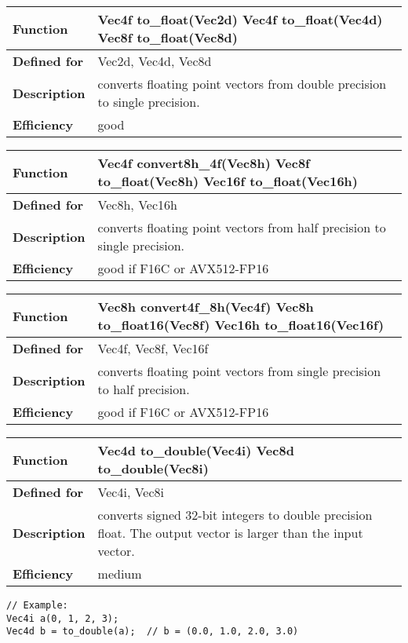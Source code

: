 \documentclass[vcl_manual.tex]{subfiles}
\begin{document}
\begin{tabular}{|p{30mm}|p{120mm}|}
\hline
\bfseries Function & 
Vec4f to\_float(Vec2d) \newline
Vec4f to\_float(Vec4d) \newline
Vec8f to\_float(Vec8d) \\ \hline
\bfseries Defined for & Vec2d, Vec4d, Vec8d \\ \hline
\bfseries Description & converts floating point vectors from double precision to single precision. \\ \hline
\bfseries Efficiency & good \\ \hline
\end{tabular}

\begin{tabular}{|p{30mm}|p{120mm}|}
\hline
\bfseries Function & 
Vec4f convert8h\_4f(Vec8h) \newline
Vec8f to\_float(Vec8h) \newline
Vec16f to\_float(Vec16h) \\ \hline
\bfseries Defined for & Vec8h, Vec16h \\ \hline
\bfseries Description & converts floating point vectors from half precision to single precision. \\ \hline
\bfseries Efficiency & good if F16C or AVX512-FP16 \\ \hline
\end{tabular}

\begin{tabular}{|p{30mm}|p{120mm}|}
\hline
\bfseries Function & 
Vec8h convert4f\_8h(Vec4f) \newline
Vec8h to\_float16(Vec8f) \newline
Vec16h to\_float16(Vec16f) \\ \hline
\bfseries Defined for & Vec4f, Vec8f, Vec16f \\ \hline
\bfseries Description & converts floating point vectors from single precision to half precision. \\ \hline
\bfseries Efficiency & good if F16C or AVX512-FP16 \\ \hline
\end{tabular}

\begin{tabular}{|p{30mm}|p{120mm}|}
\hline
\bfseries Function & 
Vec4d to\_double(Vec4i) \newline
Vec8d to\_double(Vec8i) \\ \hline
\bfseries Defined for & Vec4i, Vec8i \\ \hline
\bfseries Description & converts signed 32-bit integers to double precision float. The output vector is larger than the input vector. \\ \hline
\bfseries Efficiency & medium \\ \hline
\end{tabular}
\begin{lstlisting}[frame=none]
// Example:
Vec4i a(0, 1, 2, 3);
Vec4d b = to_double(a);  // b = (0.0, 1.0, 2.0, 3.0)
\end{lstlisting}
\end{document}

